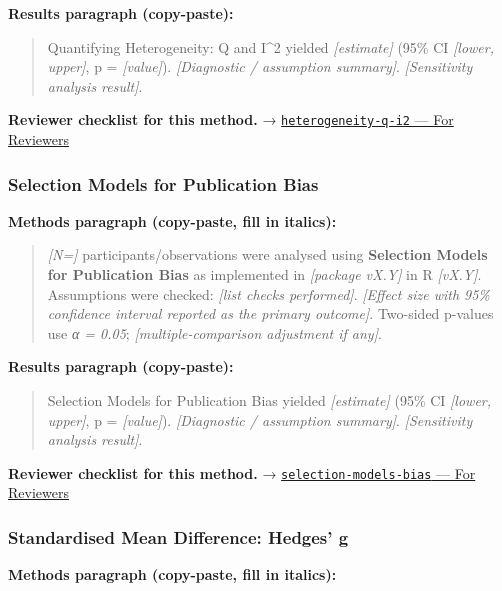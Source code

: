 \documentclass[
]{article}
\begin{document}
\textbf{Results paragraph (copy-paste):}

\begin{quote}
Quantifying Heterogeneity: Q and I\^{}2 yielded \emph{{[}estimate{]}}
(95\% CI \emph{{[}lower, upper{]}}, p = \emph{{[}value{]}}).
\emph{{[}Diagnostic / assumption summary{]}}. \emph{{[}Sensitivity
analysis result{]}}.
\end{quote}

\textbf{Reviewer checklist for this method.} →
\href{../chapters/15-metaanalysis/heterogeneity-q-i2.Rmd\#for-reviewers}{\texttt{heterogeneity-q-i2}
--- For Reviewers}

\subsubsection{Selection Models for Publication
Bias}\label{selection-models-for-publication-bias}

\textbf{Methods paragraph (copy-paste, fill in italics):}

\begin{quote}
\emph{{[}N={]}} participants/observations were analysed using
\textbf{Selection Models for Publication Bias} as implemented in
\emph{{[}package vX.Y{]}} in R \emph{{[}vX.Y{]}}. Assumptions were
checked: \emph{{[}list checks performed{]}}. \emph{{[}Effect size with
95\% confidence interval reported as the primary outcome{]}}. Two-sided
p-values use \emph{α = 0.05}; \emph{{[}multiple-comparison adjustment if
any{]}}.
\end{quote}

\textbf{Results paragraph (copy-paste):}

\begin{quote}
Selection Models for Publication Bias yielded \emph{{[}estimate{]}}
(95\% CI \emph{{[}lower, upper{]}}, p = \emph{{[}value{]}}).
\emph{{[}Diagnostic / assumption summary{]}}. \emph{{[}Sensitivity
analysis result{]}}.
\end{quote}

\textbf{Reviewer checklist for this method.} →
\href{../chapters/15-metaanalysis/selection-models-bias.Rmd\#for-reviewers}{\texttt{selection-models-bias}
--- For Reviewers}

\subsubsection{Standardised Mean Difference: Hedges'
g}\label{standardised-mean-difference-hedges-g}

\textbf{Methods paragraph (copy-paste, fill in italics):}
\end{document}
